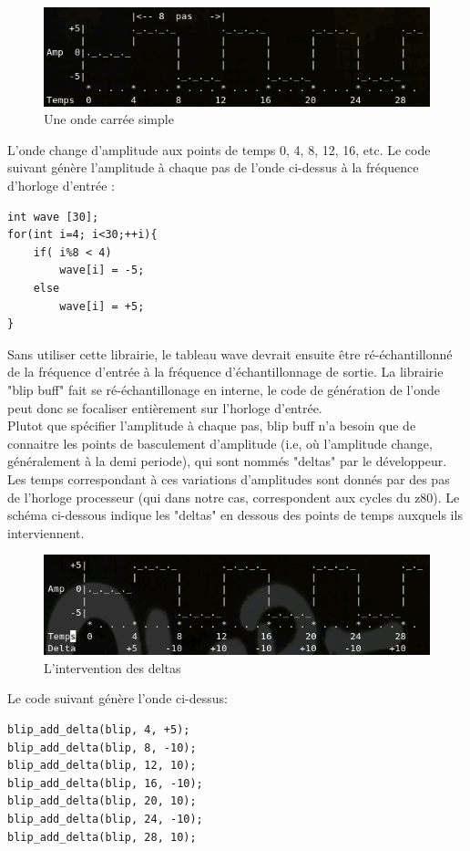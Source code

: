 \documentclass{report}
\begin{document}
\begin{figure}[!h]
\centering
\includegraphics[scale=0.5]{images/Wave1.jpg}
\caption{Une onde carrée simple}
\label{WAV1}
\end{figure}

L'onde change d'amplitude aux points de temps 0, 4, 8, 12, 16, etc.
Le code suivant génère l'amplitude à chaque pas de l'onde ci-dessus à la fréquence d'horloge d'entrée : 
\begin{lstlisting}
int wave [30];
for(int i=4; i<30;++i){
	if( i%8 < 4)
		wave[i] = -5;
	else 
		wave[i] = +5;
}
\end{lstlisting}
Sans utiliser cette librairie, le tableau wave devrait ensuite être ré-échantillonné de la fréquence d'entrée à la fréquence d'échantillonnage de sortie. La librairie "blip buff" fait se ré-échantillonage en interne, le code de génération de l'onde peut donc se focaliser entièrement sur l'horloge d'entrée.\\
Plutot que spécifier l'amplitude à chaque pas, blip buff n'a besoin que de connaitre les points de basculement d'amplitude (i.e, où l'amplitude change, généralement à la demi periode), qui sont nommés "deltas" par le développeur. Les temps correspondant à ces variations d'amplitudes sont donnés par des pas de l'horloge processeur (qui dans notre cas, correspondent aux cycles du z80). 
Le schéma ci-dessous indique les "deltas" en dessous des points de temps auxquels ils interviennent.

\begin{figure}[!h]
\centering
\includegraphics[scale=0.5]{images/Wave2.jpg}
\caption{L'intervention des deltas}
\label{WAV2}
\end{figure}

Le code suivant génère l'onde ci-dessus:
\begin{lstlisting}
blip_add_delta(blip, 4, +5);
blip_add_delta(blip, 8, -10);
blip_add_delta(blip, 12, 10);
blip_add_delta(blip, 16, -10);
blip_add_delta(blip, 20, 10);
blip_add_delta(blip, 24, -10);
blip_add_delta(blip, 28, 10);
\end{lstlisting}
\end{document}
